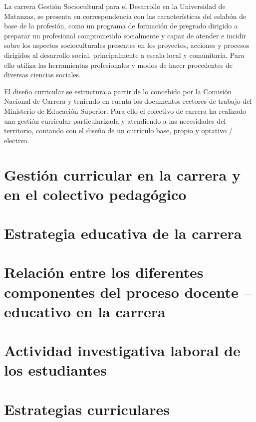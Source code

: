 La carrera Gestión Sociocultural para el Desarrollo en la Universidad de Matanzas, se presenta en correspondencia con las características del eslabón de base de la profesión, como un programa de formación de pregrado dirigido a preparar un profesional comprometido socialmente y capaz de atender e incidir sobre los aspectos socioculturales presentes en los proyectos, acciones y procesos dirigidos al desarrollo social, principalmente a escala local y comunitaria. Para ello utiliza las herramientas profesionales y modos de hacer procedentes de diversas ciencias sociales.

El diseño curricular se estructura a partir de lo concebido por la Comisión Nacional de Carrera y teniendo en cuenta los documentos rectores de trabajo del Ministerio de Educación Superior. Para ello el colectivo de carrera ha realizado una gestión curricular particularizada y atendiendo a las necesidades del territorio, contando con el diseño de un currículo base, propio y optativo / electivo.  

\section{Gestión curricular en la carrera y en el colectivo pedagógico}



\section{Estrategia educativa de la carrera}



\section{Relación entre los diferentes componentes del proceso docente – educativo en la carrera}



\section{Actividad investigativa laboral de los estudiantes}



\section{Estrategias curriculares }

